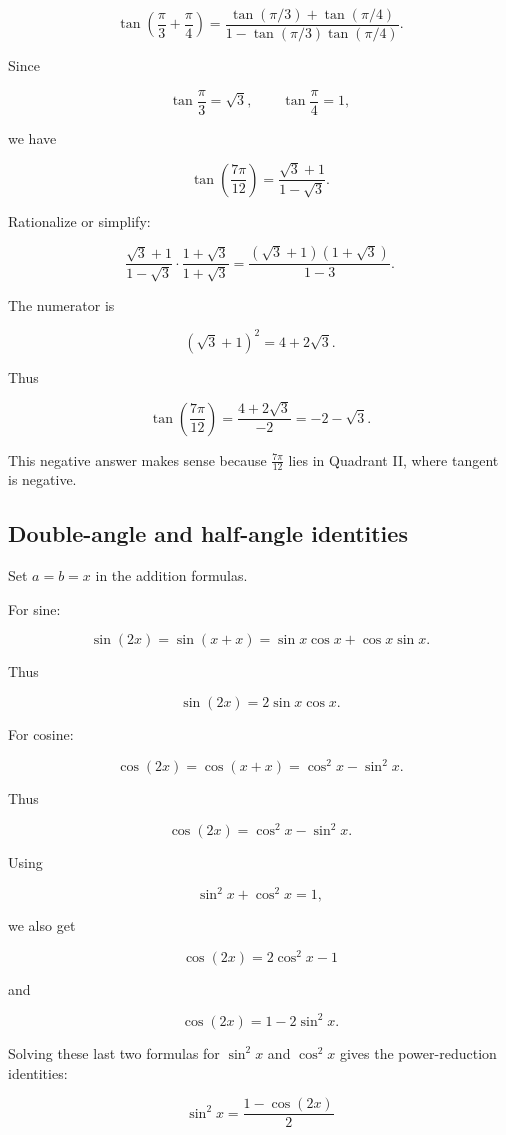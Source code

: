 \[
\tan\left(\frac{\pi}{3}+\frac{\pi}{4}\right)
=
\frac{\tan(\pi/3)+\tan(\pi/4)}{1-\tan(\pi/3)\tan(\pi/4)}.
\]

Since

\[
\tan\frac{\pi}{3}=\sqrt3,
\qquad
\tan\frac{\pi}{4}=1,
\]

we have

\[
\tan\left(\frac{7\pi}{12}\right)
=
\frac{\sqrt3+1}{1-\sqrt3}.
\]

Rationalize or simplify:

\[
\frac{\sqrt3+1}{1-\sqrt3}
\cdot
\frac{1+\sqrt3}{1+\sqrt3}
=
\frac{(\sqrt3+1)(1+\sqrt3)}{1-3}.
\]

The numerator is

\[
(\sqrt3+1)^2=4+2\sqrt3.
\]

Thus

\[
\tan\left(\frac{7\pi}{12}\right)
=
\frac{4+2\sqrt3}{-2}
=
\boxed{
-2-\sqrt3.
}
\]

This negative answer makes sense because \(\frac{7\pi}{12}\) lies in Quadrant II,
where tangent is negative.

\subsection{Double-angle and half-angle identities}
\label{appsubsec:double-half-angle}

Set \(a=b=x\) in the addition formulas.

For sine:

\[
\sin(2x)=\sin(x+x)=\sin x\cos x+\cos x\sin x.
\]

Thus

\[
\boxed{
\sin(2x)=2\sin x\cos x.
}
\]

For cosine:

\[
\cos(2x)=\cos(x+x)=\cos^2 x-\sin^2 x.
\]

Thus

\[
\boxed{
\cos(2x)=\cos^2 x-\sin^2 x.
}
\]

Using

\[
\sin^2 x+\cos^2 x=1,
\]

we also get

\[
\boxed{
\cos(2x)=2\cos^2 x-1
}
\]

and

\[
\boxed{
\cos(2x)=1-2\sin^2 x.
}
\]

Solving these last two formulas for \(\sin^2 x\) and \(\cos^2 x\) gives the
power-reduction identities:

\[
\boxed{
\sin^2 x=\frac{1-\cos(2x)}{2}
}
\]

